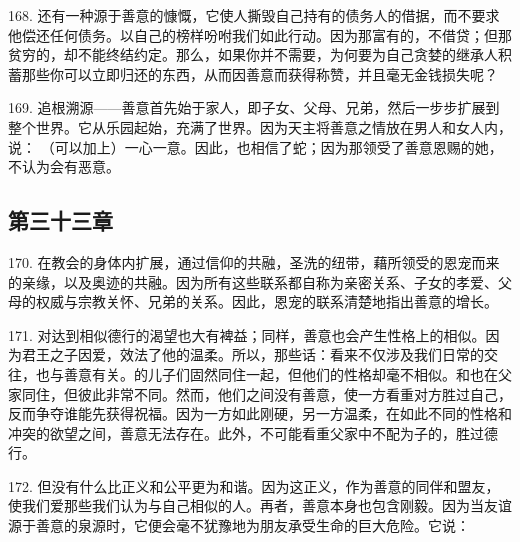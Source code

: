 168. 还有一种源于善意的慷慨，它使人撕毁自己持有的债务人的借据，而不要求他偿还任何债务。以自己的榜样吩咐我们如此行动。因为那富有的，不借贷；但那贫穷的，却不能终结约定。那么，如果你并不需要，为何要为自己贪婪的继承人积蓄那些你可以立即归还的东西，从而因善意而获得称赞，并且毫无金钱损失呢？\par

169. 追根溯源——善意首先始于家人，即子女、父母、兄弟，然后一步步扩展到整个世界。它从乐园起始，充满了世界。因为天主将善意之情放在男人和女人内，说： （可以加上）一心一意。因此，也相信了蛇；因为那领受了善意恩赐的她，不认为会有恶意。\par


\subsection{第三十三章}

\par

170. 在教会的身体内扩展，通过信仰的共融，圣洗的纽带，藉所领受的恩宠而来的亲缘，以及奥迹的共融。因为所有这些联系都自称为亲密关系、子女的孝爱、父母的权威与宗教关怀、兄弟的关系。因此，恩宠的联系清楚地指出善意的增长。\par

171. 对达到相似德行的渴望也大有裨益；同样，善意也会产生性格上的相似。因为君王之子因爱，效法了他的温柔。所以，那些话：看来不仅涉及我们日常的交往，也与善意有关。的儿子们固然同住一起，但他们的性格却毫不相似。和也在父家同住，但彼此非常不同。然而，他们之间没有善意，使一方看重对方胜过自己，反而争夺谁能先获得祝福。因为一方如此刚硬，另一方温柔，在如此不同的性格和冲突的欲望之间，善意无法存在。此外，不可能看重父家中不配为子的，胜过德行。\par

172. 但没有什么比正义和公平更为和谐。因为这正义，作为善意的同伴和盟友，使我们爱那些我们认为与自己相似的人。再者，善意本身也包含刚毅。因为当友谊源于善意的泉源时，它便会毫不犹豫地为朋友承受生命的巨大危险。它说：\par


